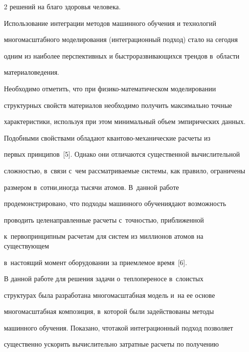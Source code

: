 \begin{multicols}{2}
решений на благо здоровья человека. 


    


    Использование интеграции методов машинного обучения и технологий 


многомасштабного моделирования (интеграционный подход) стало на сегодня 


одним из наиболее перспективных и быстроразвивающихся трендов в~области 


материаловедения. 


    


    Необходимо отметить, что при физико-ма\-те\-ма\-ти\-че\-ском моделировании 


структурных свойств материалов необходимо получить максимально точные 


характеристики, используя при этом \mbox{минимальный} объем эмпирических данных. 


Подобными свойствами обладают кван\-то\-во-ме\-ха\-ни\-че\-ские расчеты из 


первых принципов~[5]. Однако они отличаются существенной вычислительной 


сложностью, в~связи с~чем рассматриваемые сис\-те\-мы, как правило, ограничены 


размером в~сотни,\linebreak иногда тысячи атомов. В~данной работе 


продемонстрировано, что подходы машинного обучения\linebreak дают возможность 


проводить целенаправленные расчеты с~точ\-ностью, приближенной 


к~первопринципным расчетам для систем из миллионов атомов на существующем 


в~настоящий момент оборудовании за приемлемое время~[6].


    


    В данной работе для решения задачи о~теплопереносе в~слоистых 


структурах была разработана многомасштабная модель и~на ее основе 


многомасштабная композиция, в~которой были задействованы методы 


машинного обучения. Показано, что\linebreak такой интеграционный подход позволяет 


существенно ускорить вычислительно затратные расчеты по получению 



\end{multicols}
